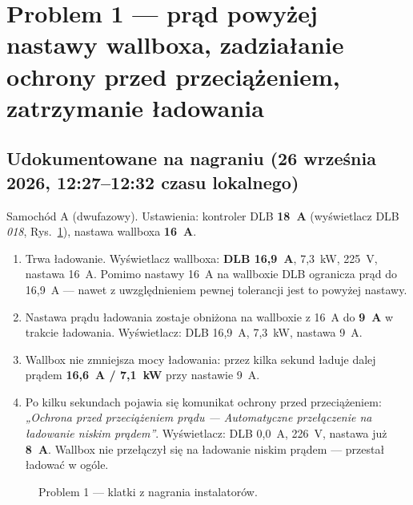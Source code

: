 \documentclass[11pt,a4paper]{article}
\begin{document}
\section{Problem 1 — prąd powyżej nastawy wallboxa, zadziałanie ochrony przed przeciążeniem, zatrzymanie ładowania}

\subsection{Udokumentowane na nagraniu (26 września 2026, 12:27–12:32 czasu lokalnego)}

Samochód A (dwufazowy). Ustawienia: kontroler DLB \textbf{18~A} (wyświetlacz DLB \emph{018}, Rys.~\ref{fig:p1}), nastawa wallboxa \textbf{16~A}.

\begin{enumerate}[leftmargin=2.2em]
\item {} Trwa ładowanie. Wyświetlacz wallboxa: \textbf{DLB 16,9~A}, 7,3~kW, 225~V, nastawa 16~A. Pomimo nastawy 16~A na wallboxie DLB ogranicza prąd do 16,9~A — nawet z uwzględnieniem pewnej tolerancji jest to powyżej nastawy.
\item {} Nastawa prądu ładowania zostaje obniżona na wallboxie z 16~A do \textbf{9~A} w trakcie ładowania. Wyświetlacz: DLB 16,9~A, 7,3~kW, nastawa 9~A.
\item {} Wallbox nie zmniejsza mocy ładowania: przez kilka sekund ładuje dalej prądem \textbf{16,6~A / 7,1~kW} przy nastawie 9~A.
\item {} Po kilku sekundach pojawia się komunikat ochrony przed przeciążeniem: \emph{„Ochrona przed przeciążeniem prądu — Automatyczne przełączenie na ładowanie niskim prądem”}. Wyświetlacz: DLB 0,0~A, 226~V, nastawa już \textbf{8~A}. Wallbox nie przełączył się na ładowanie niskim prądem — przestał ładować w ogóle.
\end{enumerate}

\begin{figure}[H]
\centering
{}\hfill
{}\hfill
{}\hfill
{}\hfill
{}
\caption{Problem 1 — klatki z nagrania instalatorów.}
\label{fig:p1}
\end{figure}
\end{document}
